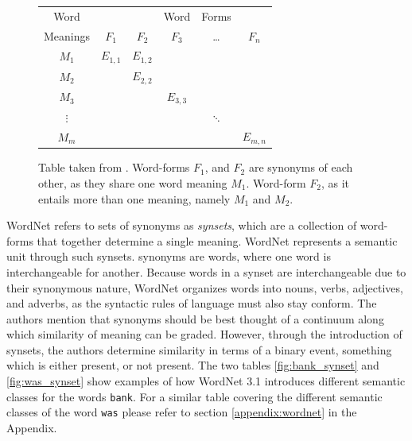 \documentclass[a4paper,12pt,oneside,openright]{report}
\begin{document}
\begin{figure}
\begin{center}
\begin{tabular}{ | c | c  c  c  c  c | } 
 \hline
 Word        &  &  & Word & Forms &  \\ 
 Meanings & $F_1$ & $F_2$ & $F_3$ & \ldots & $F_n$ \\ 
 \hline
 $M_1$     & $E_{1,1}$ & $E_{1,2}$ &  &  &  \\ 
 $M_2$     &  & $E_{2,2}$ &  &  &  \\ 
 $M_3$     &  &  & $E_{3, 3}$ &  &  \\ 
 $\vdots$ &  &  &  & $\ddots$ &  \\ 
 $M_m$    &  &  &  &  & $E_{m, n}$ \\ 
 \hline
\end{tabular}
\end{center}
\caption{Table taken from \cite{miller90}. Word-forms $F_1$, and $F_2$ are synonyms of each other, as they share one word meaning $M_1$. Word-form $F_2$, as it entails more than one meaning, namely $M_1$ and $M_2$.}
\label{fig:wordnet_table}
\end{figure}

WordNet refers to sets of synonyms as \textit{synsets}, which are a collection of word-forms that together determine a single meaning.
WordNet represents a semantic unit through such synsets.
synonyms are words, where one word is interchangeable for another.
Because words in a synset are interchangeable due to their synonymous nature, WordNet organizes words into nouns, verbs, adjectives, and adverbs, as the syntactic rules of language must also stay conform.
The authors mention that synonyms should be best thought of a continuum along which similarity of meaning can be graded.
However, through the introduction of synsets, the authors determine similarity in terms of a binary event, something which is either present, or not present.
The two tables \ref{fig:bank_synset} and \ref{fig:was_synset} show examples of how WordNet 3.1 introduces different semantic classes for the words \texttt{bank}.
For a similar table covering the different semantic classes of the word \texttt{was} please refer to section \ref{appendix:wordnet} in the Appendix.
\end{document}

